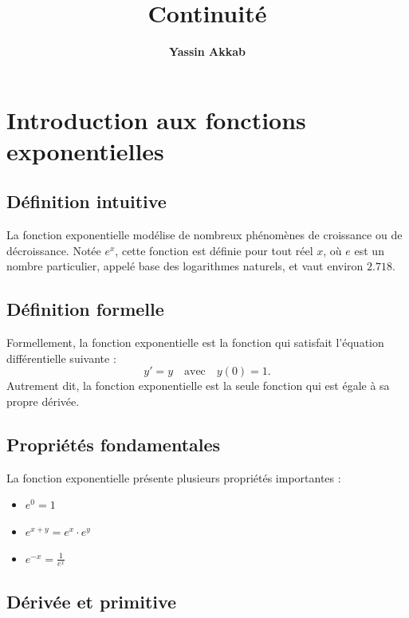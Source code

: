 \documentclass{article}
\title{\textbf{Continuité}}
\author{\textbf{Yassin Akkab}}
\begin{document}
	
	\maketitle
	
	
	
	\tableofcontents
	
	\newpage
	
	\section{Introduction aux fonctions exponentielles}
	
	\subsection{Définition intuitive}
	
	La fonction exponentielle modélise de nombreux phénomènes de croissance ou de décroissance. Notée \( e^x \), cette fonction est définie pour tout réel \( x \), où \( e \) est un nombre particulier, appelé base des logarithmes naturels, et vaut environ \( 2.718 \).
	
	\subsection{Définition formelle}
	
	Formellement, la fonction exponentielle est la fonction qui satisfait l'équation différentielle suivante :
	\[
	y' = y \quad \text{avec} \quad y(0) = 1.
	\]
	Autrement dit, la fonction exponentielle est la seule fonction qui est égale à sa propre dérivée.
	
	\subsection{Propriétés fondamentales}
	
	La fonction exponentielle présente plusieurs propriétés importantes :
	\begin{itemize}
		\item \( e^0 = 1 \)
		\item \( e^{x+y} = e^x \cdot e^y \)
		\item \( e^{-x} = \frac{1}{e^x} \)
	\end{itemize}
	
	\subsection{Dérivée et primitive}
	
\end{document}
